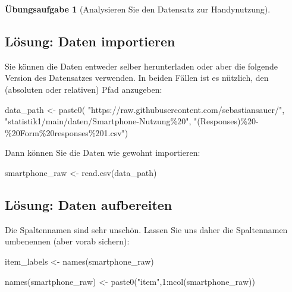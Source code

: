 \documentclass[
  a4paper,
]{scrbook}
\newenvironment{Shaded}{\begin{snugshade}}{\end{snugshade}}
\newcommand{\DecValTok}[1]{\textcolor[rgb]{0.68,0.00,0.00}{#1}}
\newcommand{\FunctionTok}[1]{\textcolor[rgb]{0.28,0.35,0.67}{#1}}
\newcommand{\NormalTok}[1]{\textcolor[rgb]{0.00,0.23,0.31}{#1}}
\newcommand{\OtherTok}[1]{\textcolor[rgb]{0.00,0.23,0.31}{#1}}
\newcommand{\SpecialCharTok}[1]{\textcolor[rgb]{0.37,0.37,0.37}{#1}}
\newcommand{\StringTok}[1]{\textcolor[rgb]{0.13,0.47,0.30}{#1}}
\theoremstyle{definition}
\theoremstyle{definition}
\theoremstyle{definition}
\newtheorem{exercise}{Übungsaufgabe}[chapter]
\theoremstyle{remark}
\begin{document}
\begin{exercise}[Analysieren Sie den Datensatz zur
Handynutzung]
\subsection{Lösung: Daten
importieren}\label{luxf6sung-daten-importieren}

Sie können die Daten entweder selber herunterladen oder aber die
folgende Version des Datensatzes verwenden. In beiden Fällen ist es
nützlich, den (absoluten oder relativen) Pfad anzugeben:

\begin{Shaded}
\begin{Highlighting}[]
\NormalTok{data\_path }\OtherTok{\textless{}{-}} \FunctionTok{paste0}\NormalTok{(}
  \StringTok{"https://raw.githubusercontent.com/sebastiansauer/"}\NormalTok{,}
  \StringTok{"statistik1/main/daten/Smartphone{-}Nutzung\%20"}\NormalTok{,}
  \StringTok{"(Responses)\%20{-}\%20Form\%20responses\%201.csv"}\NormalTok{)}
\end{Highlighting}
\end{Shaded}

Dann können Sie die Daten wie gewohnt importieren:

\begin{Shaded}
\begin{Highlighting}[]
\NormalTok{smartphone\_raw }\OtherTok{\textless{}{-}} \FunctionTok{read.csv}\NormalTok{(data\_path)}
\end{Highlighting}
\end{Shaded}

\subsection{Lösung: Daten
aufbereiten}\label{luxf6sung-daten-aufbereiten}

Die Spaltennamen sind sehr unschön. Lassen Sie uns daher die
Spaltennamen umbenennen (aber vorab sichern):

\begin{Shaded}
\begin{Highlighting}[]
\NormalTok{item\_labels }\OtherTok{\textless{}{-}} \FunctionTok{names}\NormalTok{(smartphone\_raw)}

\FunctionTok{names}\NormalTok{(smartphone\_raw) }\OtherTok{\textless{}{-}} \FunctionTok{paste0}\NormalTok{(}\StringTok{"item"}\NormalTok{,}\DecValTok{1}\SpecialCharTok{:}\FunctionTok{ncol}\NormalTok{(smartphone\_raw))}
\end{Highlighting}
\end{Shaded}

\end{exercise}
\end{document}
